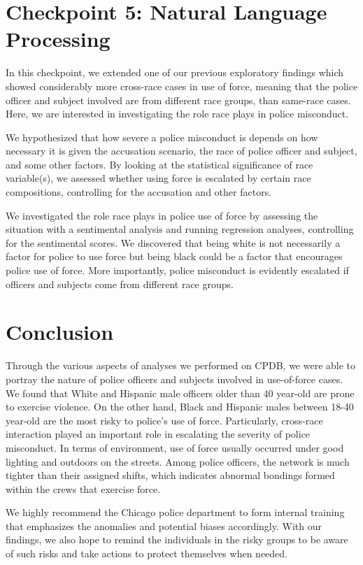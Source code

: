 \documentclass[10pt]{article}
\begin{document}
\section*{Checkpoint 5: Natural Language Processing}

In this checkpoint, we extended one of our previous exploratory findings which showed considerably more cross-race cases in use of force, meaning that the police officer and subject involved are from different race groups, than same-race cases. Here, we are interested in investigating the role race plays in police misconduct.

We hypothesized that how severe a police misconduct is depends on how necessary it is given the accusation scenario, the race of police officer and subject, and some other factors. By looking at the statistical significance of race variable(s), we assessed whether using force is escalated by certain race compositions, controlling for the accusation and other factors.

We investigated the role race plays in police use of force by assessing the situation with a sentimental analysis and running regression analyses, controlling for the sentimental scores. We discovered that being white is not necessarily a factor for police to use force but being black could be a factor that encourages police use of force. More importantly, police misconduct is evidently escalated if officers and subjects come from different race groups.



\section*{Conclusion}

Through the various aspects of analyses we performed on CPDB, we were able to portray the nature of police officers and subjects involved in use-of-force cases. We found that White and Hispanic male officers older than 40 year-old are prone to exercise violence. On the other hand, Black and Hispanic males between 18-40 year-old are the most risky to police’s use of force. Particularly, cross-race interaction played an important role in escalating the severity of police misconduct. In terms of environment, use of force usually occurred under good lighting and outdoors on the streets. Among police officers, the network is much tighter than their assigned shifts, which indicates abnormal bondings formed within the crews that exercise force.

We highly recommend the Chicago police department to form internal training that emphasizes the anomalies and potential biases accordingly. With our findings, we also hope to remind the individuals in the risky groups to be aware of such risks and take actions to protect themselves when needed. 
\end{document}

